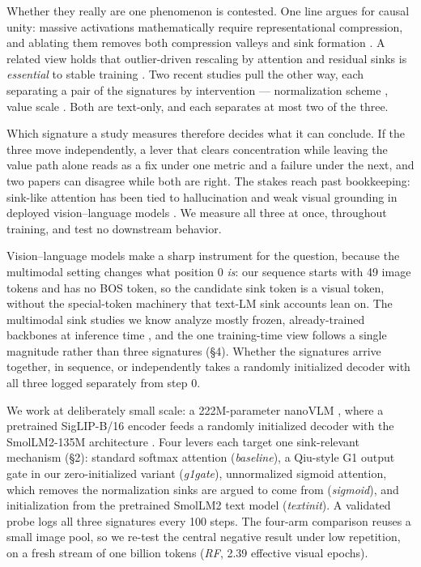 \documentclass{article}
\begin{document}
Whether they really are one phenomenon is contested. One line argues for causal unity: massive activations mathematically require representational compression, and ablating them removes both compression valleys and sink formation \cite{ref7}. A related view holds that outlier-driven rescaling by attention and residual sinks is \textit{essential} to stable training \cite{ref8}. Two recent studies pull the other way, each separating a pair of the signatures by intervention --- normalization scheme \cite{ref9}, value scale \cite{ref10}. Both are text-only, and each separates at most two of the three.

Which signature a study measures therefore decides what it can conclude. If the three move independently, a lever that clears concentration while leaving the value path alone reads as a fix under one metric and a failure under the next, and two papers can disagree while both are right. The stakes reach past bookkeeping: sink-like attention has been tied to hallucination and weak visual grounding in deployed vision--language models \cite{ref13,ref14,ref15,ref16}. We measure all three at once, throughout training, and test no downstream behavior.

Vision--language models make a sharp instrument for the question, because the multimodal setting changes what position 0 \textit{is}: our sequence starts with 49 image tokens and has no BOS token, so the candidate sink token is a visual token, without the special-token machinery that text-LM sink accounts lean on. The multimodal sink studies we know analyze mostly frozen, already-trained backbones at inference time \cite{ref11,ref12}, and the one training-time view follows a single magnitude rather than three signatures (\S4). Whether the signatures arrive together, in sequence, or independently takes a randomly initialized decoder with all three logged separately from step 0.

We work at deliberately small scale: a 222M-parameter nanoVLM \cite{ref17}, where a pretrained SigLIP-B/16 encoder \cite{ref18} feeds a randomly initialized decoder with the SmolLM2-135M architecture \cite{ref19}. Four levers each target one sink-relevant mechanism (\S2): standard softmax attention (\textit{baseline}), a Qiu-style G1 output gate in our zero-initialized variant \cite{ref20} (\textit{g1gate}), unnormalized sigmoid attention, which removes the normalization sinks are argued to come from \cite{ref6} (\textit{sigmoid}), and initialization from the pretrained SmolLM2 text model (\textit{textinit}). A validated probe logs all three signatures every 100 steps. The four-arm comparison reuses a small image pool, so we re-test the central negative result under low repetition, on a fresh stream of one billion tokens (\textit{RF}, 2.39 effective visual epochs).
\end{document}
